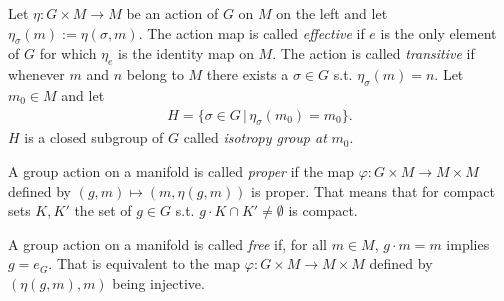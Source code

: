 \begin{definition}
\textup{\cite[3.61]{Warner1983}}
Let $\eta \colon G \times M \to M$ be an action of $G$ on $M$ on the left and let $\eta_{\sigma}(m) := \eta(\sigma,m)$. The action map is called \emph{effective} if $e$ is the only element of $G$ for which $\eta_e$ is the identity map on $M$. The action is called \emph{transitive} if whenever $m$ and $n$ belong to $M$ there exists a $\sigma \in G$ s.t. $\eta_{\sigma}(m) = n$. Let $m_0 \in M$ and let 
\begin{align*}
H = \{\sigma \in G \, \vert \, \eta_{\sigma}(m_0) = m_0\}.
\end{align*}
$H$ is a closed subgroup of $G$ called \emph{isotropy group at} $m_0$.
\end{definition}

\begin{definition}
A group action on a manifold is called \emph{proper} if the map $\varphi \colon G \times M \to M \times M$ defined by $(g,m) \mapsto (m, \eta(g,m))$ is proper. That means that for compact sets $K,K'$ the set of $g \in G$ s.t. $g \cdot K \cap K' \neq \emptyset$ is compact. 
\end{definition}
\begin{definition}
A group action on a manifold is called \emph{free} if, for all $m \in M$, $g \cdot m = m$ implies $g = e_G$. That is equivalent to the map $\varphi \colon G \times M \to M \times M$ defined by $(\eta(g,m),m)$ being injective.
\end{definition}

